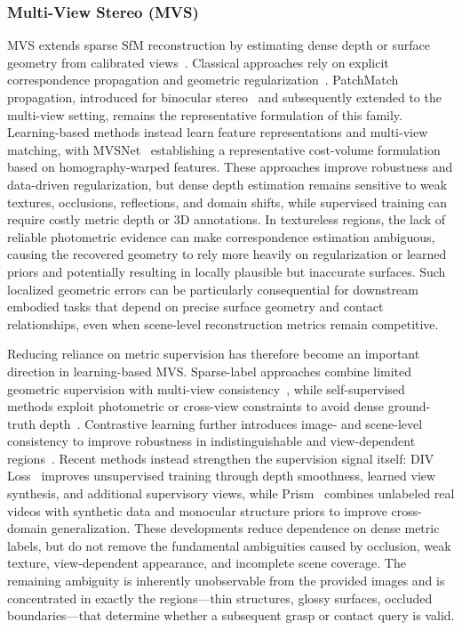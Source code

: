 \documentclass{SCIS2026}
\begin{document}
\subsubsection{Multi-View Stereo (MVS)}
MVS extends sparse SfM reconstruction by estimating dense depth or surface geometry from calibrated views~\cite{furukawa2015multiview}. Classical approaches rely on explicit correspondence propagation and geometric regularization~\cite{furukawa2010accurate}. PatchMatch propagation, introduced for binocular stereo~\cite{bleyer2011patchmatch} and subsequently extended to the multi-view setting, remains the representative formulation of this family. Learning-based methods instead learn feature representations and multi-view matching, with MVSNet~\cite{yao2018mvsnet} establishing a representative cost-volume formulation based on homography-warped features. These approaches improve robustness and data-driven regularization, but dense depth estimation remains sensitive to weak textures, occlusions, reflections, and domain shifts, while supervised training can require costly metric depth or 3D annotations. In textureless regions, the lack of reliable photometric evidence can make correspondence estimation ambiguous, causing the recovered geometry to rely more heavily on regularization or learned priors and potentially resulting in locally plausible but inaccurate surfaces. Such localized geometric errors can be particularly consequential for downstream embodied tasks that depend on precise surface geometry and contact relationships, even when scene-level reconstruction metrics remain competitive.

Reducing reliance on metric supervision has therefore become an important direction in learning-based MVS. Sparse-label approaches combine limited geometric supervision with multi-view consistency~\cite{kim2021just}, while self-supervised methods exploit photometric or cross-view constraints to avoid dense ground-truth depth~\cite{xu2021digging}. Contrastive learning further introduces image- and scene-level consistency to improve robustness in indistinguishable and view-dependent regions~\cite{xiong2025cl}. Recent methods instead strengthen the supervision signal itself: DIV Loss~\cite{rich2024smoothness} improves unsupervised training through depth smoothness, learned view synthesis, and additional supervisory views, while Prism~\cite{rich2026prism} combines unlabeled real videos with synthetic data and monocular structure priors to improve cross-domain generalization. These developments reduce dependence on dense metric labels, but do not remove the fundamental ambiguities caused by occlusion, weak texture, view-dependent appearance, and incomplete scene coverage. The remaining ambiguity is inherently unobservable from the provided images and is concentrated in exactly the regions---thin structures, glossy surfaces, occluded boundaries---that determine whether a subsequent grasp or contact query is valid.
\end{document}
